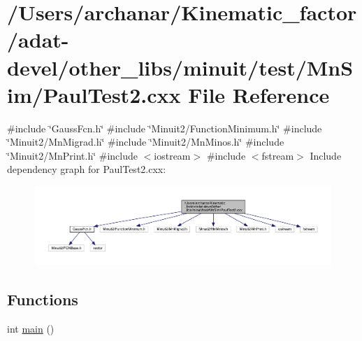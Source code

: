 \hypertarget{adat-devel_2other__libs_2minuit_2test_2MnSim_2PaulTest2_8cxx}{}\section{/\+Users/archanar/\+Kinematic\+\_\+factor/adat-\/devel/other\+\_\+libs/minuit/test/\+Mn\+Sim/\+Paul\+Test2.cxx File Reference}
\label{adat-devel_2other__libs_2minuit_2test_2MnSim_2PaulTest2_8cxx}
{\ttfamily \#include \char`\"{}Gauss\+Fcn.\+h\char`\"{}}\newline
{\ttfamily \#include \char`\"{}Minuit2/\+Function\+Minimum.\+h\char`\"{}}\newline
{\ttfamily \#include \char`\"{}Minuit2/\+Mn\+Migrad.\+h\char`\"{}}\newline
{\ttfamily \#include \char`\"{}Minuit2/\+Mn\+Minos.\+h\char`\"{}}\newline
{\ttfamily \#include \char`\"{}Minuit2/\+Mn\+Print.\+h\char`\"{}}\newline
{\ttfamily \#include $<$iostream$>$}\newline
{\ttfamily \#include $<$fstream$>$}\newline
Include dependency graph for Paul\+Test2.\+cxx\+:
\nopagebreak
\begin{figure}[H]
\begin{center}
\leavevmode
\includegraphics[width=350pt]{df/d37/adat-devel_2other__libs_2minuit_2test_2MnSim_2PaulTest2_8cxx__incl}
\end{center}
\end{figure}
\subsection*{Functions}
\begin{DoxyCompactItemize}
\item 
int \mbox{\hyperlink{adat-devel_2other__libs_2minuit_2test_2MnSim_2PaulTest2_8cxx_ae66f6b31b5ad750f1fe042a706a4e3d4}{main}} ()
\end{DoxyCompactItemize}


